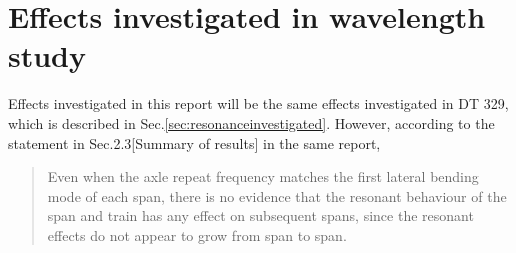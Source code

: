 





\section{Effects investigated in wavelength study}

Effects investigated in this report will be the same effects investigated in DT 329, which is described in Sec.\ref{sec:resonanceinvestigated}. However, according to the statement in Sec.2.3[Summary of results] in the same report,

\begin{quote}
Even when the axle repeat frequency matches the first lateral bending mode of each span, there is no evidence that the resonant behaviour of the span and train has any effect on subsequent spans, since the resonant effects do not appear to grow from span to span.
\end{quote}

